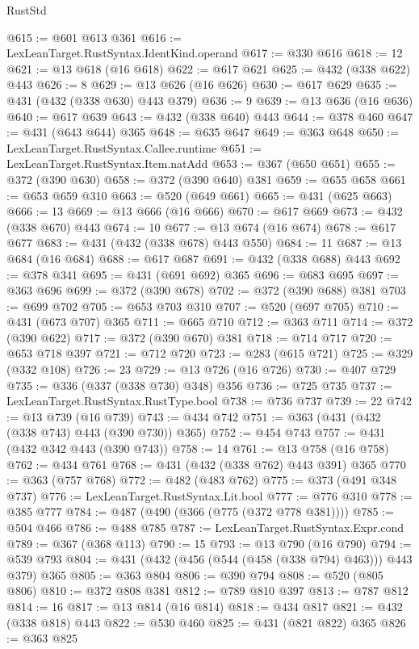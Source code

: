 \begin{lexlean}{RustStd}
\begin{coremodule}
{\begin{coremodule}
{{{{{{{{{{@615 := @601 @613 @361
@616 := LexLeanTarget.RustSyntax.IdentKind.operand
@617 := @330 @616
@618 := 12
@621 := @13 @618 (@16 @618)
@622 := @617 @621
@625 := @432 (@338 @622) @443
@626 := 8
@629 := @13 @626 (@16 @626)
@630 := @617 @629
@635 := @431 (@432 (@338 @630) @443 @379)
@636 := 9
@639 := @13 @636 (@16 @636)
@640 := @617 @639
@643 := @432 (@338 @640) @443
@644 := @378 @460
@647 := @431 (@643 @644) @365
@648 := @635 @647
@649 := @363 @648
@650 := LexLeanTarget.RustSyntax.Callee.runtime
@651 := LexLeanTarget.RustSyntax.Item.natAdd
@653 := @367 (@650 @651)
@655 := @372 (@390 @630)
@658 := @372 (@390 @640) @381
@659 := @655 @658
@661 := @653 @659 @310
@663 := @520 (@649 @661)
@665 := @431 (@625 @663)
@666 := 13
@669 := @13 @666 (@16 @666)
@670 := @617 @669
@673 := @432 (@338 @670) @443
@674 := 10
@677 := @13 @674 (@16 @674)
@678 := @617 @677
@683 := @431 (@432 (@338 @678) @443 @550)
@684 := 11
@687 := @13 @684 (@16 @684)
@688 := @617 @687
@691 := @432 (@338 @688) @443
@692 := @378 @341
@695 := @431 (@691 @692) @365
@696 := @683 @695
@697 := @363 @696
@699 := @372 (@390 @678)
@702 := @372 (@390 @688) @381
@703 := @699 @702
@705 := @653 @703 @310
@707 := @520 (@697 @705)
@710 := @431 (@673 @707) @365
@711 := @665 @710
@712 := @363 @711
@714 := @372 (@390 @622)
@717 := @372 (@390 @670) @381
@718 := @714 @717
@720 := @653 @718 @397
@721 := @712 @720
@723 := @283 (@615 @721)
@725 := @329 (@332 @108)
@726 := 23
@729 := @13 @726 (@16 @726)
@730 := @407 @729
@735 := @336 (@337 (@338 @730) @348) @356
@736 := @725 @735
@737 := LexLeanTarget.RustSyntax.RustType.bool
@738 := @736 @737
@739 := 22
@742 := @13 @739 (@16 @739)
@743 := @434 @742
@751 := @363 (@431 (@432 (@338 @743) @443 (@390 @730)) @365)
@752 := @454 @743
@757 := @431 (@432 @342 @443 (@390 @743))
@758 := 14
@761 := @13 @758 (@16 @758)
@762 := @434 @761
@768 := @431 (@432 (@338 @762) @443 @391) @365
@770 := @363 (@757 @768)
@772 := @482 (@483 @762)
@775 := @373 (@491 @348 @737)
@776 := LexLeanTarget.RustSyntax.Lit.bool
@777 := @776 @310
@778 := @385 @777
@784 := @487 (@490 (@366 (@775 (@372 @778 @381))))
@785 := @504 @466
@786 := @488 @785
@787 := LexLeanTarget.RustSyntax.Expr.cond
@789 := @367 (@368 @113)
@790 := 15
@793 := @13 @790 (@16 @790)
@794 := @539 @793
@804 := @431 (@432 (@456 (@544 (@458 (@338 @794) @463))) @443 @379) @365
@805 := @363 @804
@806 := @390 @794
@808 := @520 (@805 @806)
@810 := @372 @808 @381
@812 := @789 @810 @397
@813 := @787 @812
@814 := 16
@817 := @13 @814 (@16 @814)
@818 := @434 @817
@821 := @432 (@338 @818) @443
@822 := @530 @460
@825 := @431 (@821 @822) @365
@826 := @363 @825
}}}}}}}}}}
\end{coremodule}}
\end{coremodule}
\end{lexlean}
